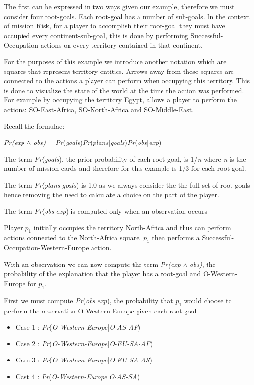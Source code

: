 \documentclass[parskip]{cs4rep}
\begin{document}
The first can be expressed in two ways given our example, therefore we must consider four root-goals. Each root-goal has a number of sub-goals. In the context of mission Risk, for a player to accomplish their root-goal they must have occupied every continent-sub-goal, this is done by performing Successful-Occupation actions on every territory contained in that continent. 

For the purposes of this example we introduce another notation which are squares that represent territory entities. Arrows away from these squares are connected to the actions a player can perform when occupying this territory. This is done to visualize the state of the world at the time the action was performed. For example by occupying the territory Egypt, allows a player to perform the actions: SO-East-Africa, SO-North-Africa and SO-Middle-East.

Recall the formulae:\newline

\centerline{
\textit{Pr(exp} $\wedge$ \textit{obs)} = \textit{Pr}(\textit{goals})\textit{Pr}(\textit{plans}|\textit{goals})\textit{Pr}(\textit{obs}|\textit{exp})
}

The term \textit{Pr}(\textit{goals}), the prior probability of each root-goal, is 1/\textit{n} where \textit{n} is the number of mission cards and therefore for this example is 1/3 for each root-goal. 

The term \textit{Pr}(\textit{plans}|\textit{goals}) is 1.0 as we always consider the the full set of root-goals hence removing the need to calculate a choice on the part of the player.

The term \textit{Pr}(\textit{obs}|\textit{exp}) is computed only when an observation occurs.

Player $p_1$ initially occupies the territory North-Africa and thus can perform actions connected to the North-Africa square. $p_1$ then performs a Successful-Occupation-Western-Europe action.

With an observation we can now compute the term \textit{Pr(exp} $\wedge$ \textit{obs)}, the probability of the explanation that the player has a root-goal and O-Western-Europe for $p_1$.

First we must compute \textit{Pr}(\textit{obs}|\textit{exp}), the probability that $p_1$ would choose to perform the observation O-Western-Europe given each root-goal.

\begin{itemize}
\item
Case 1 : \textit{Pr}(\textit{O-Western-Europe}|\textit{O-AS-AF})
\item
Case 2 : \textit{Pr}(\textit{O-Western-Europe}|\textit{O-EU-SA-AF})
\item
Case 3 : \textit{Pr}(\textit{O-Western-Europe}|\textit{O-EU-SA-AS})
\item
Cast 4 : \textit{Pr}(\textit{O-Western-Europe}|\textit{O-AS-SA})
\end{itemize}
\end{document}
